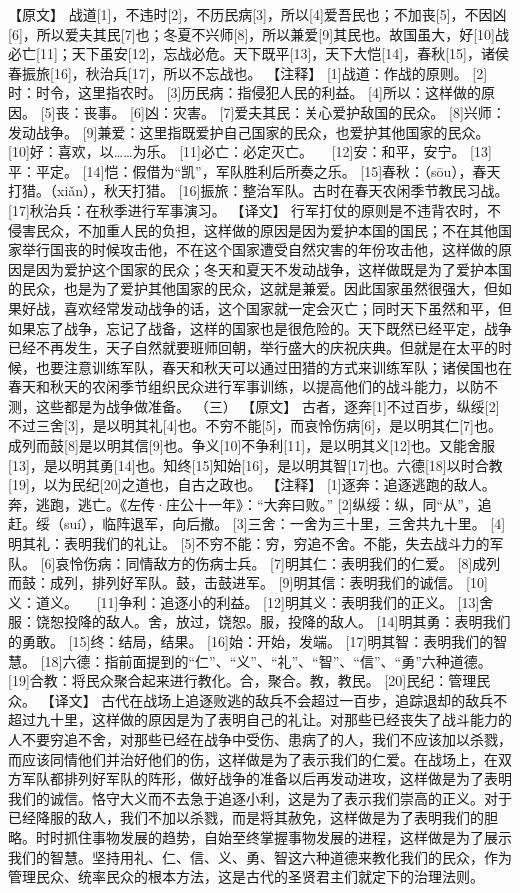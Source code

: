 \documentclass[a4paper,12pt,UTF8,twoside]{ctexbook}
\begin{document}
【原文】
战道[1]，不违时[2]，不历民病[3]，所以[4]爱吾民也；不加丧[5]，不因凶[6]，所以爱夫其民[7]也；冬夏不兴师[8]，所以兼爱[9]其民也。故国虽大，好[10]战必亡[11]；天下虽安[12]，忘战必危。天下既平[13]，天下大恺[14]，春秋[15]，诸侯春振旅[16]，秋治兵[17]，所以不忘战也。
【注释】
[1]战道：作战的原则。
[2]时：时令，这里指农时。
[3]历民病：指侵犯人民的利益。
[4]所以：这样做的原因。
[5]丧：丧事。
[6]凶：灾害。
[7]爱夫其民：关心爱护敌国的民众。
[8]兴师：发动战争。
[9]兼爱：这里指既爱护自己国家的民众，也爱护其他国家的民众。
[10]好：喜欢，以……为乐。
[11]必亡：必定灭亡。
　[12]安：和平，安宁。
[13]平：平定。
[14]恺：假借为“凯”，军队胜利后所奏之乐。
[15]春秋：（sōu），春天打猎。（xiǎn），秋天打猎。
[16]振旅：整治军队。古时在春天农闲季节教民习战。
[17]秋治兵：在秋季进行军事演习。
【译文】
行军打仗的原则是不违背农时，不侵害民众，不加重人民的负担，这样做的原因是因为爱护本国的国民；不在其他国家举行国丧的时候攻击他，不在这个国家遭受自然灾害的年份攻击他，这样做的原因是因为爱护这个国家的民众；冬天和夏天不发动战争，这样做既是为了爱护本国的民众，也是为了爱护其他国家的民众，这就是兼爱。因此国家虽然很强大，但如果好战，喜欢经常发动战争的话，这个国家就一定会灭亡；同时天下虽然和平，但如果忘了战争，忘记了战备，这样的国家也是很危险的。天下既然已经平定，战争已经不再发生，天子自然就要班师回朝，举行盛大的庆祝庆典。但就是在太平的时候，也要注意训练军队，春天和秋天可以通过田猎的方式来训练军队；诸侯国也在春天和秋天的农闲季节组织民众进行军事训练，以提高他们的战斗能力，以防不测，这些都是为战争做准备。
（三）
【原文】
古者，逐奔[1]不过百步，纵绥[2]不过三舍[3]，是以明其礼[4]也。不穷不能[5]，而哀怜伤病[6]，是以明其仁[7]也。成列而鼓[8]是以明其信[9]也。争义[10]不争利[11]，是以明其义[12]也。又能舍服[13]，是以明其勇[14]也。知终[15]知始[16]，是以明其智[17]也。六德[18]以时合教[19]，以为民纪[20]之道也，自古之政也。
【注释】
[1]逐奔：追逐逃跑的敌人。奔，逃跑，逃亡。《左传·庄公十一年》：“大奔曰败。”
[2]纵绥：纵，同“从”，追赶。绥（suí），临阵退军，向后撤。
[3]三舍：一舍为三十里，三舍共九十里。
[4]明其礼：表明我们的礼让。
[5]不穷不能：穷，穷追不舍。不能，失去战斗力的军队。
[6]哀怜伤病：同情敌方的伤病士兵。
[7]明其仁：表明我们的仁爱。
[8]成列而鼓：成列，排列好军队。鼓，击鼓进军。
[9]明其信：表明我们的诚信。
[10]义：道义。
　[11]争利：追逐小的利益。
[12]明其义：表明我们的正义。
[13]舍服：饶恕投降的敌人。舍，放过，饶恕。服，投降的敌人。
[14]明其勇：表明我们的勇敢。
[15]终：结局，结果。
[16]始：开始，发端。
[17]明其智：表明我们的智慧。
[18]六德：指前面提到的“仁”、“义”、“礼”、“智”、“信”、“勇”六种道德。
[19]合教：将民众聚合起来进行教化。合，聚合。教，教民。
[20]民纪：管理民众。
【译文】
古代在战场上追逐败逃的敌兵不会超过一百步，追踪退却的敌兵不超过九十里，这样做的原因是为了表明自己的礼让。对那些已经丧失了战斗能力的人不要穷追不舍，对那些已经在战争中受伤、患病了的人，我们不应该加以杀戮，而应该同情他们并治好他们的伤，这样做是为了表示我们的仁爱。在战场上，在双方军队都排列好军队的阵形，做好战争的准备以后再发动进攻，这样做是为了表明我们的诚信。恪守大义而不去急于追逐小利，这是为了表示我们崇高的正义。对于已经降服的敌人，我们不加以杀戮，而是将其赦免，这样做是为了表明我们的胆略。时时抓住事物发展的趋势，自始至终掌握事物发展的进程，这样做是为了展示我们的智慧。坚持用礼、仁、信、义、勇、智这六种道德来教化我们的民众，作为管理民众、统率民众的根本方法，这是古代的圣贤君主们就定下的治理法则。
\end{document}
